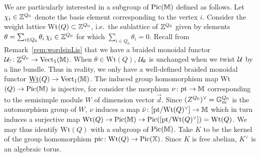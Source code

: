 \documentclass[12pt]{amsart}
\begin{document}
We are particularly interested in a subgroup of $\operatorname{Pic}(\mathbb{M})$ defined as follows. Let $\chi_i \in \mathbb{Z}^{Q_0}$ denote the basis element corresponding to the vertex $i$. Consider the weight lattice Wt$(Q) \subset \mathbb{Z}^{Q_0}$, i.e.\ the sublattice of $\mathbb{Z}^{Q_0}$ given by elements $\theta = \sum_{i\in Q_0} \theta_i \,\chi_i \in \mathbb{Z}^{Q_0}$ for which $\sum_{i \in Q_0} \theta_i = 0$. Recall from Remark~\ref{rem:wordsinLis} that we have a braided monoidal functor  $\mathcal{U}_? \colon  \underline{\mathbb{Z}}^{Q_0} \to \operatorname{Vect}_1(\mathbb{M})$. When $\theta \in \text{Wt}(Q)$, $\mathcal{U}_{\theta}$ is  unchanged when we twist $\mathcal{U}$ by a line bundle. Thus in reality, we only have a well-defined braided monoidal functor $\underline{\text{Wt}}(Q) \to \operatorname{Vect}_1(\mathbb{M})$. 
The induced group homomorphism map Wt$(Q) \to \operatorname{Pic}(\mathbb{M})$ is injective, for consider the morphism $\nu \colon \text{pt} \rightarrow \mathbb{M}$ corresponding to the semisimple module $W$ of dimension vector $\vec{d}$. Since $(Z^{Q_0})^{\vee} = \mathbb{G}_m^{Q_0}$ is the automorphism group of $W$, $\nu$ induces a map $\bar{\nu} \colon [\text{pt}/\text{Wt}(Q)^{\vee}] \rightarrow \mathbb{M}$ which in turn induces a surjective map $\text{Wt}(Q) \rightarrow \operatorname{Pic}(\mathbb{M}) \rightarrow \operatorname{Pic} ([\text{pt}/\text{Wt}(Q)^{\vee}]) = \text{Wt}(Q)$. We may thus identify Wt$(Q)$ with a subgroup of $\operatorname{Pic}(\mathbb{M})$. Take $K$ to be the kernel of the group homomorphism $\text{pic} \colon \text{Wt}(Q) \rightarrow \operatorname{Pic}(\mathbb{X})$. Since $K$ is free abelian, $K^{\vee}$ is an algebraic torus. 
\end{document}
